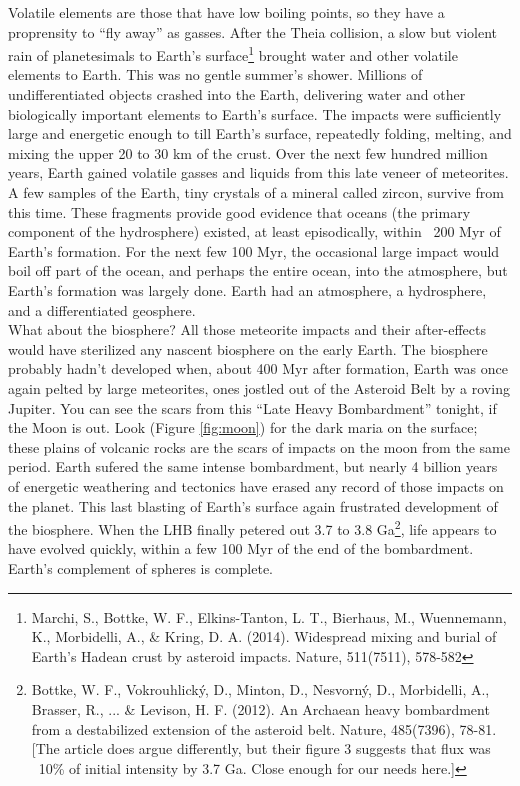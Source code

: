 Volatile elements are those that have low boiling points, so they have a proprensity to ``fly away'' as gasses. After the Theia collision, a slow but violent rain of planetesimals to Earth's surface\footnote{Marchi, S., Bottke, W. F., Elkins-Tanton, L. T., Bierhaus, M., Wuennemann, K., Morbidelli, A., \& Kring, D. A. (2014). Widespread mixing and burial of Earth's Hadean crust by asteroid impacts. Nature, 511(7511), 578-582} brought water and other volatile elements to Earth. This was no gentle summer's shower. Millions of undifferentiated objects crashed into the Earth, delivering water and other biologically important elements to Earth's surface. The impacts were sufficiently large and energetic enough to till Earth's surface, repeatedly folding, melting, and mixing the upper 20 to 30 km of the crust. Over the next few hundred million years, Earth gained volatile gasses and liquids from this late veneer of meteorites. A few samples of the Earth, tiny crystals of a mineral called zircon, survive from this time. These fragments provide good evidence that oceans (the primary component of the hydrosphere) existed, at least episodically, within ~200 Myr of Earth's formation. For the next few 100 Myr, the occasional large impact would boil off part of the ocean, and perhaps the entire ocean, into the atmosphere, but Earth's formation was largely done. Earth had an atmosphere, a hydrosphere, and a differentiated geosphere.\\
What about the biosphere? All those meteorite impacts and their after-effects would have sterilized any nascent biosphere on the early Earth. The biosphere probably hadn't developed when, about 400 Myr after formation, Earth was once again pelted by large meteorites, ones jostled out of the Asteroid Belt by a roving Jupiter. You can see the scars from this ``Late Heavy Bombardment'' tonight, if the Moon is out. Look (Figure \ref{fig:moon}) for the dark maria on the surface; these plains of volcanic rocks are the scars of impacts on the moon from the same period. Earth sufered the same intense bombardment, but nearly 4 billion years of energetic weathering and tectonics have erased any record of those impacts on the planet. This last blasting of Earth's surface again frustrated development of the biosphere. When the LHB finally petered out 3.7 to 3.8 Ga\footnote{Bottke, W. F., Vokrouhlick\'{y}, D., Minton, D., Nesvorn\'{y}, D., Morbidelli, A., Brasser, R., ... \& Levison, H. F. (2012). An Archaean heavy bombardment from a destabilized extension of the asteroid belt. Nature, 485(7396), 78-81. [The article does argue differently, but their figure 3 suggests that flux was ~10\% of initial intensity by 3.7 Ga. Close enough for our needs here.]}, life appears to have evolved quickly, within a few 100 Myr of the end of the bombardment. Earth's complement of spheres is complete.\\

